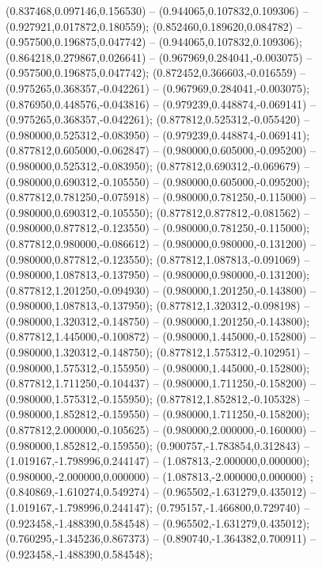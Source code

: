  (0.837468,0.097146,0.156530) -- (0.944065,0.107832,0.109306) -- (0.927921,0.017872,0.180559);
 (0.852460,0.189620,0.084782) -- (0.957500,0.196875,0.047742) -- (0.944065,0.107832,0.109306);
 (0.864218,0.279867,0.026641) -- (0.967969,0.284041,-0.003075) -- (0.957500,0.196875,0.047742);
 (0.872452,0.366603,-0.016559) -- (0.975265,0.368357,-0.042261) -- (0.967969,0.284041,-0.003075);
 (0.876950,0.448576,-0.043816) -- (0.979239,0.448874,-0.069141) -- (0.975265,0.368357,-0.042261);
 (0.877812,0.525312,-0.055420) -- (0.980000,0.525312,-0.083950) -- (0.979239,0.448874,-0.069141);
 (0.877812,0.605000,-0.062847) -- (0.980000,0.605000,-0.095200) -- (0.980000,0.525312,-0.083950);
 (0.877812,0.690312,-0.069679) -- (0.980000,0.690312,-0.105550) -- (0.980000,0.605000,-0.095200);
 (0.877812,0.781250,-0.075918) -- (0.980000,0.781250,-0.115000) -- (0.980000,0.690312,-0.105550);
 (0.877812,0.877812,-0.081562) -- (0.980000,0.877812,-0.123550) -- (0.980000,0.781250,-0.115000);
 (0.877812,0.980000,-0.086612) -- (0.980000,0.980000,-0.131200) -- (0.980000,0.877812,-0.123550);
 (0.877812,1.087813,-0.091069) -- (0.980000,1.087813,-0.137950) -- (0.980000,0.980000,-0.131200);
 (0.877812,1.201250,-0.094930) -- (0.980000,1.201250,-0.143800) -- (0.980000,1.087813,-0.137950);
 (0.877812,1.320312,-0.098198) -- (0.980000,1.320312,-0.148750) -- (0.980000,1.201250,-0.143800);
 (0.877812,1.445000,-0.100872) -- (0.980000,1.445000,-0.152800) -- (0.980000,1.320312,-0.148750);
 (0.877812,1.575312,-0.102951) -- (0.980000,1.575312,-0.155950) -- (0.980000,1.445000,-0.152800);
 (0.877812,1.711250,-0.104437) -- (0.980000,1.711250,-0.158200) -- (0.980000,1.575312,-0.155950);
 (0.877812,1.852812,-0.105328) -- (0.980000,1.852812,-0.159550) -- (0.980000,1.711250,-0.158200);
 (0.877812,2.000000,-0.105625) -- (0.980000,2.000000,-0.160000) -- (0.980000,1.852812,-0.159550);
 (0.900757,-1.783854,0.312843) -- (1.019167,-1.798996,0.244147) -- (1.087813,-2.000000,0.000000);
 (0.980000,-2.000000,0.000000) -- (1.087813,-2.000000,0.000000) ;
 (0.840869,-1.610274,0.549274) -- (0.965502,-1.631279,0.435012) -- (1.019167,-1.798996,0.244147);
 (0.795157,-1.466800,0.729740) -- (0.923458,-1.488390,0.584548) -- (0.965502,-1.631279,0.435012);
 (0.760295,-1.345236,0.867373) -- (0.890740,-1.364382,0.700911) -- (0.923458,-1.488390,0.584548);

